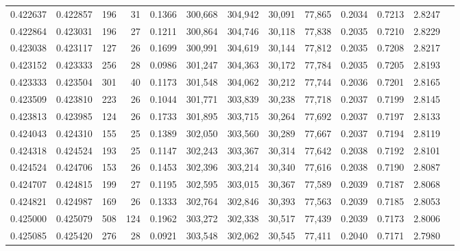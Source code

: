 \begin{tabular}{rrrrrrrrrrrrr}
0.422637 & 0.422857 &    196 &    31 &                                     0.1366 & 300,668 & 304,942 &  30,091 &  77,865 & 0.2034 & 0.7213 & 2.8247 \\
0.422864 & 0.423031 &    196 &    27 &                                     0.1211 & 300,864 & 304,746 &  30,118 &  77,838 & 0.2035 & 0.7210 & 2.8229 \\
0.423038 & 0.423117 &    127 &    26 &                                     0.1699 & 300,991 & 304,619 &  30,144 &  77,812 & 0.2035 & 0.7208 & 2.8217 \\
0.423152 & 0.423333 &    256 &    28 &                                     0.0986 & 301,247 & 304,363 &  30,172 &  77,784 & 0.2035 & 0.7205 & 2.8193 \\
0.423333 & 0.423504 &    301 &    40 &                                     0.1173 & 301,548 & 304,062 &  30,212 &  77,744 & 0.2036 & 0.7201 & 2.8165 \\
0.423509 & 0.423810 &    223 &    26 &                                     0.1044 & 301,771 & 303,839 &  30,238 &  77,718 & 0.2037 & 0.7199 & 2.8145 \\
0.423813 & 0.423985 &    124 &    26 &                                     0.1733 & 301,895 & 303,715 &  30,264 &  77,692 & 0.2037 & 0.7197 & 2.8133 \\
0.424043 & 0.424310 &    155 &    25 &                                     0.1389 & 302,050 & 303,560 &  30,289 &  77,667 & 0.2037 & 0.7194 & 2.8119 \\
0.424318 & 0.424524 &    193 &    25 &                                     0.1147 & 302,243 & 303,367 &  30,314 &  77,642 & 0.2038 & 0.7192 & 2.8101 \\
0.424524 & 0.424706 &    153 &    26 &                                     0.1453 & 302,396 & 303,214 &  30,340 &  77,616 & 0.2038 & 0.7190 & 2.8087 \\
0.424707 & 0.424815 &    199 &    27 &                                     0.1195 & 302,595 & 303,015 &  30,367 &  77,589 & 0.2039 & 0.7187 & 2.8068 \\
0.424821 & 0.424987 &    169 &    26 &                                     0.1333 & 302,764 & 302,846 &  30,393 &  77,563 & 0.2039 & 0.7185 & 2.8053 \\
0.425000 & 0.425079 &    508 &   124 &                                     0.1962 & 303,272 & 302,338 &  30,517 &  77,439 & 0.2039 & 0.7173 & 2.8006 \\
0.425085 & 0.425420 &    276 &    28 &                                     0.0921 & 303,548 & 302,062 &  30,545 &  77,411 & 0.2040 & 0.7171 & 2.7980 \\

\end{tabular}
